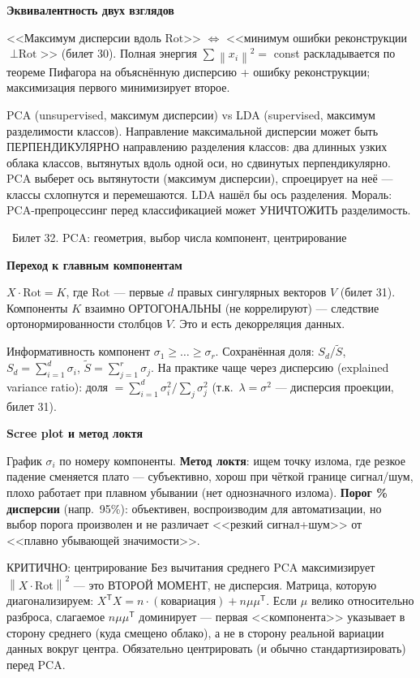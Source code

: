 \documentclass[12pt, a4paper]{article}
\newcommand{\bilet}[2]{%
  \vspace{10pt}%
  \noindent\colorbox{qcolor}{\parbox{\dimexpr\linewidth-2\fboxsep\relax}{%
    \color{white}\large\bfseries\strut\ Билет #1. #2%
  }}%
  \nopagebreak\vspace{5pt}\par\nopagebreak%
}
\newcommand{\qsub}[1]{%
  \vspace{5pt}%
  {\bfseries\color{defblue} #1}%
  \par\vspace{2pt}%
}
\newcommand{\tr}{^{\mathsf{T}}}
\newcommand{\norm}[1]{\left\lVert #1 \right\rVert}
\begin{document}
\qsub{Эквивалентность двух взглядов}
<<Максимум дисперсии вдоль $\text{Rot}$>> $\Leftrightarrow$ <<минимум ошибки реконструкции $\perp \text{Rot}$>> (билет 30). Полная энергия $\sum\norm{x_i}^2 = $ const раскладывается по теореме Пифагора на объяснённую дисперсию + ошибку реконструкции; максимизация первого минимизирует второе.

\begin{fishkabox}
PCA (unsupervised, максимум дисперсии) vs LDA (supervised, максимум разделимости классов). Направление максимальной дисперсии может быть ПЕРПЕНДИКУЛЯРНО направлению разделения классов: два длинных узких облака классов, вытянутых вдоль одной оси, но сдвинутых перпендикулярно. PCA выберет ось вытянутости (максимум дисперсии), спроецирует на неё --- классы схлопнутся и перемешаются. LDA нашёл бы ось разделения. Мораль: PCA-препроцессинг перед классификацией может УНИЧТОЖИТЬ разделимость.
\end{fishkabox}

\bilet{32}{PCA: геометрия, выбор числа компонент, центрирование}

\qsub{Переход к главным компонентам}
$X \cdot \text{Rot} = K$, где $\text{Rot}$ --- первые $d$ правых сингулярных векторов $V$ (билет 31). Компоненты $K$ взаимно ОРТОГОНАЛЬНЫ (не коррелируют) --- следствие ортонормированности столбцов $V$. Это и есть декорреляция данных.

\begin{defbox}{Информативность компонент}
$\sigma_1 \ge \dots \ge \sigma_r$. Сохранённая доля: $S_d/\widetilde S$, $S_d = \sum_{i=1}^d \sigma_i$, $\widetilde S = \sum_{j=1}^r \sigma_j$. На практике чаще через дисперсию (explained variance ratio): доля $= \sum_{i=1}^d \sigma_i^2 \big/ \sum_j \sigma_j^2$ (т.к.\ $\lambda = \sigma^2$ --- дисперсия проекции, билет 31).
\end{defbox}

\qsub{Scree plot и метод локтя}
График $\sigma_i$ по номеру компоненты. \textbf{Метод локтя}: ищем точку излома, где резкое падение сменяется плато --- субъективно, хорош при чёткой границе сигнал/шум, плохо работает при плавном убывании (нет однозначного излома). \textbf{Порог \% дисперсии} (напр.\ 95\%): объективен, воспроизводим для автоматизации, но выбор порога произволен и не различает <<резкий сигнал+шум>> от <<плавно убывающей значимости>>.

\begin{propbox}{КРИТИЧНО: центрирование}
Без вычитания среднего PCA максимизирует $\norm{X\cdot\text{Rot}}^2$ --- это ВТОРОЙ МОМЕНТ, не дисперсия. Матрица, которую диагонализируем: $X\tr X = n\cdot(\text{ковариация}) + n\mu\mu\tr$. Если $\mu$ велико относительно разброса, слагаемое $n\mu\mu\tr$ доминирует --- первая <<компонента>> указывает в сторону среднего (куда смещено облако), а не в сторону реальной вариации данных вокруг центра. Обязательно центрировать (и обычно стандартизировать) перед PCA.
\end{propbox}
\end{document}
